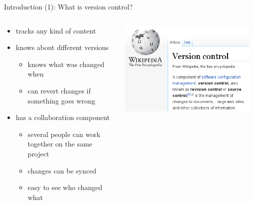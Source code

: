 \begin{frame}{Introduction (1): What is version control?}
  \begin{columns}[onlytextwidth]
    \begin{column}{0.6\textwidth}
      \begin{itemize}
          \item tracks any kind of content
          \item knows about different versions
          \begin{itemize}
            \item knows what was changed when
            \item can revert changes if something goes wrong
          \end{itemize}
          \item has a collaboration component
          \begin{itemize}
            \item several people can work together on the same project
            \item changes can be synced
            \item easy to see who changed what
          \end{itemize}
        \end{itemize}
    \end{column}
    \begin{column}[t]{0.4\textwidth}
      \includegraphics[width=0.95\textwidth]{imgs/vc_wikipedia}
    \end{column}
  \end{columns}
\end{frame}

